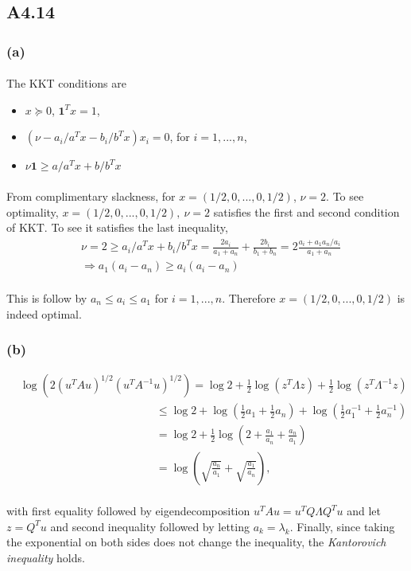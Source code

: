 \subsection*{A4.14}
\subsubsection*{(a)}
\paragraph{}
The KKT conditions are
\begin{itemize}
	\item $x\succeq 0$, $\textbf{1}^Tx =1$,
	\item $(\nu - a_i/a^Tx-b_i/b^Tx )x_i = 0$, for $i =1,...,n$,
	\item $\nu\textbf{1} \geq a/a^Tx+b/b^Tx$
\end{itemize}
\paragraph{}
From complimentary slackness, for $x  = (1/2, 0,...,0, 1/2)$, $\nu =2$. To see optimality, $x = (1/2, 0,...,0, 1/2),\ \nu =2$ satisfies the first and second condition of KKT. To see it satisfies the last inequality,
\begin{align*}
&\nu =2 \geq a_i/a^Tx+b_i/b^Tx = \frac{2a_i}{a_1+a_n} +\frac{2b_i}{b_1+b_n} = 2\frac{a_i+a_1a_n/a_i}{a_1+a_n} \\
&\Rightarrow a_1(a_i - a_n) \geq a_i(a_i-a_n)
\end{align*}
\paragraph{}
This is follow by $a_n \leq a_i \leq a_1$ for $i=1,...,n$. Therefore $x  = (1/2, 0,...,0, 1/2)$ is indeed optimal.
\subsubsection*{(b)}
\begin{align*}
&\log(2(u^TAu)^{1/2}(u^TA^{-1}u)^{1/2}) = \log2 +\frac{1}{2}\log(z^T\Lambda z) + \frac{1}{2}\log(z^T\Lambda^{-1} z)\\
&\qquad \qquad \qquad \qquad \qquad \qquad \ \leq \log2 +\log(\frac{1}{2}a_1+\frac{1}{2}a_n) +\log(\frac{1}{2}a_1^{-1}+\frac{1}{2}a_n^{-1}) \\
&\qquad \qquad \qquad \qquad \qquad \qquad \ = \log2 +\frac{1}{2}\log(2+\frac{a_1}{a_n}+\frac{a_n}{a_1})\\
&\qquad \qquad \qquad \qquad \qquad \qquad \  =\log(\sqrt{\frac{a_n}{a_1}}+ \sqrt{\frac{a_1}{a_n}}),
\end{align*}
\paragraph{}
with first equality followed by eigendecomposition $u^TAu =u^TQ\Lambda Q^Tu$ and let $z = Q^Tu$ and second inequality followed by letting $a_k =\lambda_k$. Finally, since taking the exponential on both sides does not change the inequality, the \textit{Kantorovich inequality} holds.
